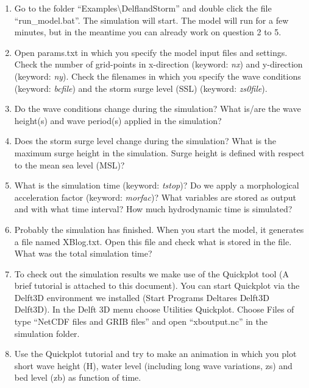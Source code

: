 \documentclass{article}
\begin{document}
\begin{enumerate}
\item  Go to the folder ``Examples\textbackslash DelflandStorm'' and double click the file ``run\_model.bat''. The simulation will start. The model will run for a few minutes, but in the meantime you can already work on question 2 to 5.

\item  Open params.txt in which you specify the model input files and settings. Check the number of grid-points in x-direction (keyword: \textit{nx}) and y-direction (keyword: \textit{ny}). Check the filenames in which you specify the wave conditions (keyword: \textit{bcfile}) and the storm surge level (SSL) (keyword: \textit{zs0file}). 

\item  Do the wave conditions change during the simulation? What is/are the wave height(s) and wave period(s) applied in the simulation?

\item  Does the storm surge level change during the simulation? What is the maximum surge height in the simulation. Surge height is defined with respect to the mean sea level (MSL)?

\item  What is the simulation time (keyword: \textit{tstop})? Do we apply a morphological acceleration factor (keyword: \textit{morfac})? What variables are stored as output and with what time interval? How much hydrodynamic time is simulated?

\item  Probably the simulation has finished. When you start the model, it generates a file named XBlog.txt. Open this file and check what is stored in the file. What was the total simulation time?

\item  To check out the simulation results we make use of the Quickplot tool (A brief tutorial is attached to this document). You can start Quickplot via the Delft3D environment we installed (Start  Programs  Deltares  Delft3D  Delft3D). In the Delft 3D menu choose Utilities  Quickplot. Choose Files of type ``NetCDF files and GRIB files'' and open ``xboutput.nc'' in the simulation folder. 

\item  Use the Quickplot tutorial and try to make an animation in which you plot short wave height (H), water level (including long wave variations, zs) and bed level (zb) as function of time.


\end{enumerate}
\end{document}
